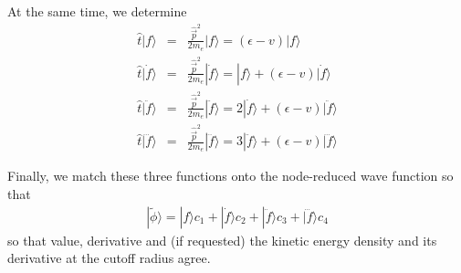 \documentclass[11pt,a4paper]{report}
\begin{document}
At the same time, we determine 
\begin{eqnarray}
\hat{t}|f\rangle&=&\frac{\hat{\vec{p}}^2}{2m_e}|f\rangle
=(\epsilon-v)|f\rangle
\nonumber\\
\hat{t}|\dot{f}\rangle&=&\frac{\hat{\vec{p}}^2}{2m_e}|\dot{f}\rangle
=|f\rangle+(\epsilon-v)|\dot{f}\rangle
\nonumber\\
\hat{t}|\ddot{f}\rangle&=&\frac{\hat{\vec{p}}^2}{2m_e}|\ddot{f}\rangle
=2|\dot{f}\rangle+(\epsilon-v)|\ddot{f}\rangle
\nonumber\\
\hat{t}|\dddot{f}\rangle&=&\frac{\hat{\vec{p}}^2}{2m_e}|\dddot{f}\rangle
=3|\ddot{f}\rangle+(\epsilon-v)|\dddot{f}\rangle
\end{eqnarray}

Finally, we match these three functions onto the node-reduced wave
function so that
\begin{eqnarray}
|\tilde{\phi}\rangle=|f\rangle c_1 
+|\dot{f}\rangle c_2
+|\ddot{f}\rangle c_3
+|\dddot{f}\rangle c_4
\end{eqnarray}
so that value, derivative and (if requested) the kinetic energy
density and its derivative at the cutoff radius agree.
\end{document}
